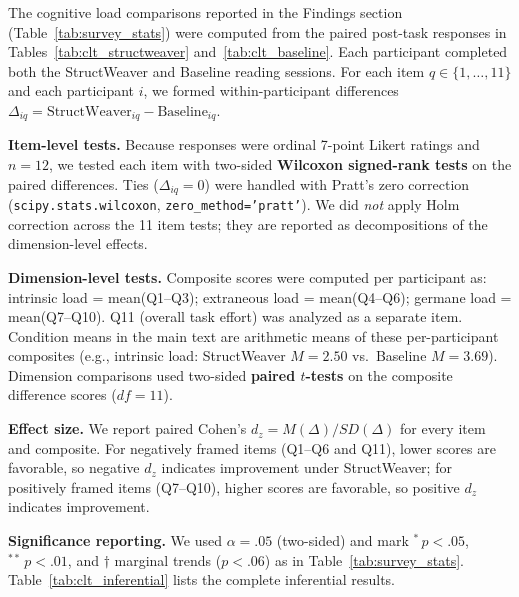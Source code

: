 \documentclass[manuscript,review,anonymous]{acmart}
\begin{document}
The cognitive load comparisons reported in the Findings section (Table~\ref{tab:survey_stats}) were computed from the paired post-task responses in Tables~\ref{tab:clt_structweaver} and~\ref{tab:clt_baseline}. Each participant completed both the StructWeaver and Baseline reading sessions. For each item $q \in \{1,\ldots,11\}$ and each participant $i$, we formed within-participant differences $\Delta_{iq} = \text{StructWeaver}_{iq} - \text{Baseline}_{iq}$.

\textbf{Item-level tests.} Because responses were ordinal 7-point Likert ratings and $n=12$, we tested each item with two-sided \textbf{Wilcoxon signed-rank tests} on the paired differences. Ties ($\Delta_{iq}=0$) were handled with Pratt's zero correction (\texttt{scipy.stats.wilcoxon}, \texttt{zero\_method='pratt'}). We did \emph{not} apply Holm correction across the 11 item tests; they are reported as decompositions of the dimension-level effects.

\textbf{Dimension-level tests.} Composite scores were computed per participant as: intrinsic load = mean(Q1--Q3); extraneous load = mean(Q4--Q6); germane load = mean(Q7--Q10). Q11 (overall task effort) was analyzed as a separate item. Condition means in the main text are arithmetic means of these per-participant composites (e.g., intrinsic load: StructWeaver $M=2.50$ vs.\ Baseline $M=3.69$). Dimension comparisons used two-sided \textbf{paired $t$-tests} on the composite difference scores ($df=11$).

\textbf{Effect size.} We report paired Cohen's $d_z = M(\Delta)/SD(\Delta)$ for every item and composite. For negatively framed items (Q1--Q6 and Q11), lower scores are favorable, so negative $d_z$ indicates improvement under StructWeaver; for positively framed items (Q7--Q10), higher scores are favorable, so positive $d_z$ indicates improvement.

\textbf{Significance reporting.} We used $\alpha=.05$ (two-sided) and mark $^{*}\,p<.05$, $^{**}\,p<.01$, and $\dagger$ marginal trends ($p<.06$) as in Table~\ref{tab:survey_stats}. Table~\ref{tab:clt_inferential} lists the complete inferential results.
\end{document}
